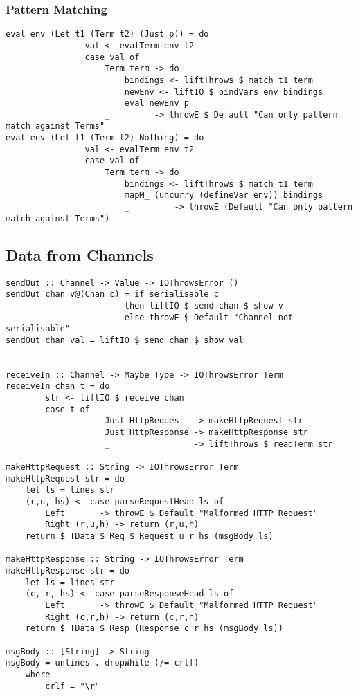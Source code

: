 \subsubsection{Pattern Matching}

\begin{verbatim}
eval env (Let t1 (Term t2) (Just p)) = do
                val <- evalTerm env t2 
                case val of 
                    Term term -> do
                        bindings <- liftThrows $ match t1 term
                        newEnv <- liftIO $ bindVars env bindings
                        eval newEnv p
                    _         -> throwE $ Default "Can only pattern match against Terms"
eval env (Let t1 (Term t2) Nothing) = do 
                val <- evalTerm env t2 
                case val of 
                    Term term -> do
                        bindings <- liftThrows $ match t1 term
                        mapM_ (uncurry (defineVar env)) bindings
                        _         -> throwE (Default "Can only pattern match against Terms")
\end{verbatim}

\subsection{Data from Channels}

\begin{verbatim}
sendOut :: Channel -> Value -> IOThrowsError () 
sendOut chan v@(Chan c) = if serialisable c
                        then liftIO $ send chan $ show v
                        else throwE $ Default "Channel not serialisable" 
sendOut chan val = liftIO $ send chan $ show val


receiveIn :: Channel -> Maybe Type -> IOThrowsError Term
receiveIn chan t = do
        str <- liftIO $ receive chan
        case t of
                    Just HttpRequest  -> makeHttpRequest str
                    Just HttpResponse -> makeHttpResponse str
                    _                 -> liftThrows $ readTerm str

makeHttpRequest :: String -> IOThrowsError Term
makeHttpRequest str = do
    let ls = lines str
    (r,u, hs) <- case parseRequestHead ls of
        Left _     -> throwE $ Default "Malformed HTTP Request"
        Right (r,u,h) -> return (r,u,h)
    return $ TData $ Req $ Request u r hs (msgBody ls)

makeHttpResponse :: String -> IOThrowsError Term
makeHttpResponse str = do
    let ls = lines str
    (c, r, hs) <- case parseResponseHead ls of
        Left _     -> throwE $ Default "Malformed HTTP Request"
        Right (c,r,h) -> return (c,r,h)
    return $ TData $ Resp (Response c r hs (msgBody ls))

msgBody :: [String] -> String
msgBody = unlines . dropWhile (/= crlf)
    where
        crlf = "\r"
\end{verbatim}


